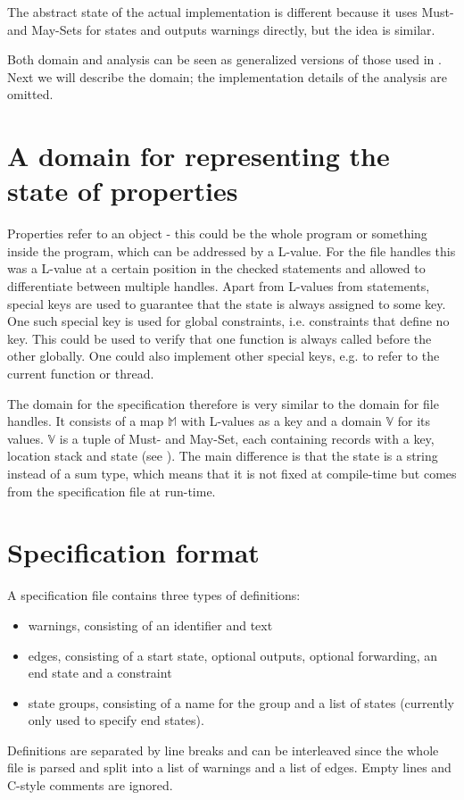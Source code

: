 The abstract state of the actual implementation is different because it uses Must- and May-Sets for states and outputs warnings directly, but the idea is similar.

Both domain and analysis can be seen as generalized versions of those used in . Next we will describe the domain; the implementation details of the analysis are omitted.


\section{A domain for representing the state of properties}
Properties refer to an object - this could be the whole program or something inside the program, which can be addressed by a L-value. For the file handles this was a L-value at a certain position in the checked statements and allowed to differentiate between multiple handles.
Apart from L-values from statements, special keys are used to guarantee that the state is always assigned to some key.
One such special key is used for global constraints, i.e. constraints that define no key. This could be used to verify that one function is always called before the other globally. One could also implement other special keys, e.g. to refer to the current function or thread.

The domain for the specification therefore is very similar to the domain for file handles. It consists of a map $\mathbb{M}$ with L-values as a key and a domain $\mathbb{V}$ for its values. $\mathbb{V}$ is a tuple of Must- and May-Set, each containing records with a key, location stack and state (see ).
The main difference is that the state is a string instead of a sum type, which means that it is not fixed at compile-time but comes from the specification file at run-time.


\section{Specification format}
A specification file contains three types of definitions:
\begin{itemize}
\item warnings, consisting of an identifier and text
\item edges, consisting of a start state, optional outputs, optional forwarding, an end state and a constraint
\item state groups, consisting of a name for the group and a list of states (currently only used to specify end states).
\end{itemize}
Definitions are separated by line breaks and can be interleaved since the whole file is parsed and split into a list of warnings and a list of edges. Empty lines and C-style comments are ignored.

